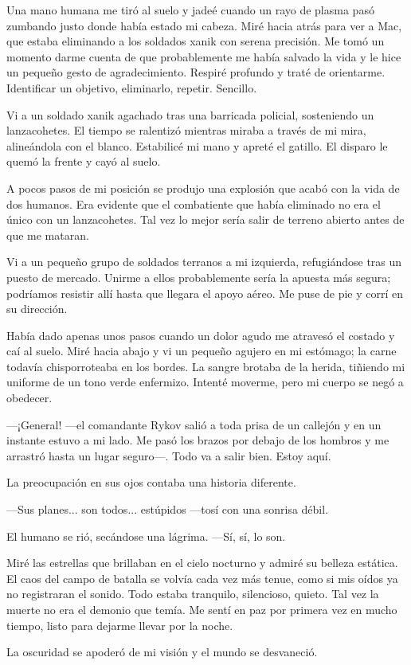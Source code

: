 Una mano humana me tiró al suelo y jadeé cuando un rayo de plasma pasó zumbando justo donde había estado mi cabeza. Miré hacia atrás para ver a Mac, que estaba eliminando a los soldados xanik con serena precisión. Me tomó un momento darme cuenta de que probablemente me había salvado la vida y le hice un pequeño gesto de agradecimiento. Respiré profundo y traté de orientarme. Identificar un objetivo, eliminarlo, repetir. Sencillo.

Vi a un soldado xanik agachado tras una barricada policial, sosteniendo un lanzacohetes. El tiempo se ralentizó mientras miraba a través de mi mira, alineándola con el blanco. Estabilicé mi mano y apreté el gatillo. El disparo le quemó la frente y cayó al suelo.

A pocos pasos de mi posición se produjo una explosión que acabó con la vida de dos humanos. Era evidente que el combatiente que había eliminado no era el único con un lanzacohetes. Tal vez lo mejor sería salir de terreno abierto antes de que me mataran.

Vi a un pequeño grupo de soldados terranos a mi izquierda, refugiándose tras un puesto de mercado. Unirme a ellos probablemente sería la apuesta más segura; podríamos resistir allí hasta que llegara el apoyo aéreo. Me puse de pie y corrí en su dirección.

Había dado apenas unos pasos cuando un dolor agudo me atravesó el costado y caí al suelo. Miré hacia abajo y vi un pequeño agujero en mi estómago; la carne todavía chisporroteaba en los bordes. La sangre brotaba de la herida, tiñiendo mi uniforme de un tono verde enfermizo. Intenté moverme, pero mi cuerpo se negó a obedecer.

—¡General! —el comandante Rykov salió a toda prisa de un callejón y en un instante estuvo a mi lado. Me pasó los brazos por debajo de los hombros y me arrastró hasta un lugar seguro—. Todo va a salir bien. Estoy aquí.

La preocupación en sus ojos contaba una historia diferente.

—Sus planes... son todos... estúpidos —tosí con una sonrisa débil.

El humano se rió, secándose una lágrima. —Sí, sí, lo son.

Miré las estrellas que brillaban en el cielo nocturno y admiré su belleza estática. El caos del campo de batalla se volvía cada vez más tenue, como si mis oídos ya no registraran el sonido. Todo estaba tranquilo, silencioso, quieto. Tal vez la muerte no era el demonio que temía. Me sentí en paz por primera vez en mucho tiempo, listo para dejarme llevar por la noche.

La oscuridad se apoderó de mi visión y el mundo se desvaneció.